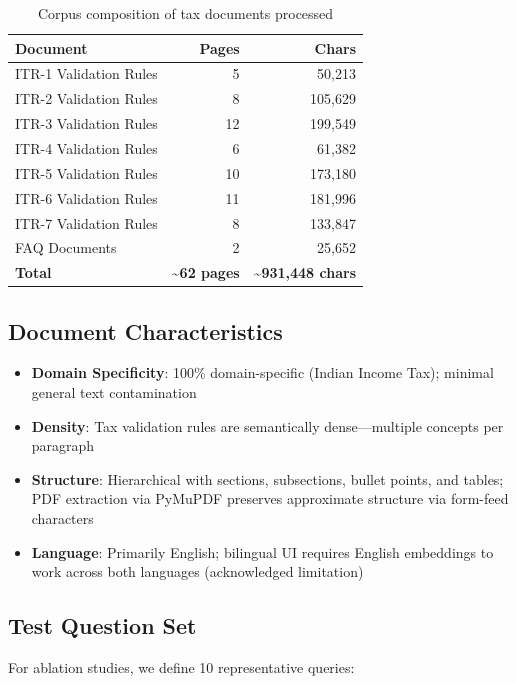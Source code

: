 \documentclass[11pt,a4paper]{article}
\begin{document}
\begin{table}[H]
\centering
\small
\begin{tabular}{lrr}
\toprule
\textbf{Document} & \textbf{Pages} & \textbf{Chars} \\
\midrule
ITR-1 Validation Rules & ~5 & 50,213 \\
ITR-2 Validation Rules & ~8 & 105,629 \\
ITR-3 Validation Rules & ~12 & 199,549 \\
ITR-4 Validation Rules & ~6 & 61,382 \\
ITR-5 Validation Rules & ~10 & 173,180 \\
ITR-6 Validation Rules & ~11 & 181,996 \\
ITR-7 Validation Rules & ~8 & 133,847 \\
FAQ Documents & ~2 & 25,652 \\
\midrule
\textbf{Total} & \textbf{\textasciitilde 62 pages} & \textbf{\textasciitilde 931,448 chars} \\
\bottomrule
\end{tabular}
\caption{Corpus composition of tax documents processed}
\label{tab:corpus}
\end{table}

\subsection{Document Characteristics}

\begin{itemize}
    \item \textbf{Domain Specificity}: 100\% domain-specific (Indian Income Tax); minimal general text contamination
    \item \textbf{Density}: Tax validation rules are semantically dense---multiple concepts per paragraph
    \item \textbf{Structure}: Hierarchical with sections, subsections, bullet points, and tables; PDF extraction via PyMuPDF preserves approximate structure via form-feed characters
    \item \textbf{Language}: Primarily English; bilingual UI requires English embeddings to work across both languages (acknowledged limitation)
\end{itemize}

\subsection{Test Question Set}

For ablation studies, we define 10 representative queries:
\end{document}
